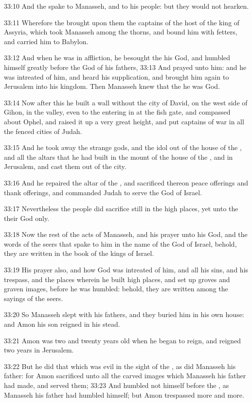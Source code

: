 33:10 And the \LORD spake to Manasseh, and to his people: but they
would not hearken.

33:11 Wherefore the \LORD brought upon them the captains of the host of
the king of Assyria, which took Manasseh among the thorns, and bound
him with fetters, and carried him to Babylon.

33:12 And when he was in affliction, he besought the \LORD his God, and
humbled himself greatly before the God of his fathers, 33:13 And
prayed unto him: and he was intreated of him, and heard his
supplication, and brought him again to Jerusalem into his kingdom.
Then Manasseh knew that the \LORD he was God.

33:14 Now after this he built a wall without the city of David, on the
west side of Gihon, in the valley, even to the entering in at the fish
gate, and compassed about Ophel, and raised it up a very great height,
and put captains of war in all the fenced cities of Judah.

33:15 And he took away the strange gods, and the idol out of the house
of the \LORD, and all the altars that he had built in the mount of the
house of the \LORD, and in Jerusalem, and cast them out of the city.

33:16 And he repaired the altar of the \LORD, and sacrificed thereon
peace offerings and thank offerings, and commanded Judah to serve the
\LORD God of Israel.

33:17 Nevertheless the people did sacrifice still in the high places,
yet unto the \LORD their God only.

33:18 Now the rest of the acts of Manasseh, and his prayer unto his
God, and the words of the seers that spake to him in the name of the
\LORD God of Israel, behold, they are written in the book of the kings
of Israel.

33:19 His prayer also, and how God was intreated of him, and all his
sins, and his trespass, and the places wherein he built high places,
and set up groves and graven images, before he was humbled: behold,
they are written among the sayings of the seers.

33:20 So Manasseh slept with his fathers, and they buried him in his
own house: and Amon his son reigned in his stead.

33:21 Amon was two and twenty years old when he began to reign, and
reigned two years in Jerusalem.

33:22 But he did that which was evil in the sight of the \LORD, as did
Manasseh his father: for Amon sacrificed unto all the carved images
which Manasseh his father had made, and served them; 33:23 And humbled
not himself before the \LORD, as Manasseh his father had humbled
himself; but Amon trespassed more and more.

